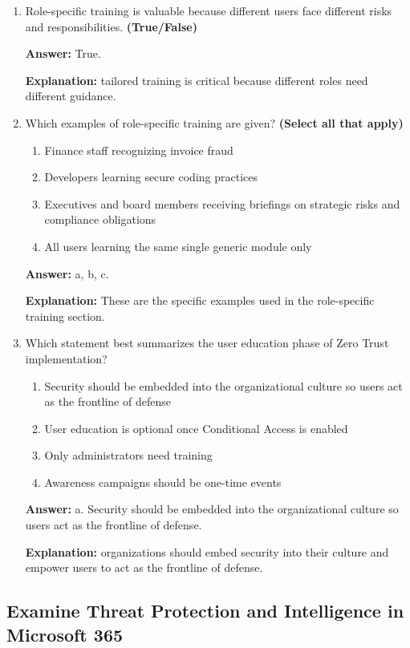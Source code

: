 \documentclass[10pt]{article}
\begin{document}
\begin{enumerate}[leftmargin=*]
\item Role-specific training is valuable because different users face different risks and responsibilities. \textbf{(True/False)}

\textbf{Answer:} True.

\textbf{Explanation:} tailored training is critical because different roles need different guidance.

\item Which examples of role-specific training are given? \textbf{(Select all that apply)}
\begin{enumerate}[label=\alph*., leftmargin=1.5em]
\item Finance staff recognizing invoice fraud
\item Developers learning secure coding practices
\item Executives and board members receiving briefings on strategic risks and compliance obligations
\item All users learning the same single generic module only
\end{enumerate}
\textbf{Answer:} a, b, c.

\textbf{Explanation:} These are the specific examples used in the role-specific training section.

\item Which statement best summarizes the user education phase of Zero Trust implementation?
\begin{enumerate}[label=\alph*., leftmargin=1.5em]
\item Security should be embedded into the organizational culture so users act as the frontline of defense
\item User education is optional once Conditional Access is enabled
\item Only administrators need training
\item Awareness campaigns should be one-time events
\end{enumerate}
\textbf{Answer:} a. Security should be embedded into the organizational culture so users act as the frontline of defense.

\textbf{Explanation:} organizations should embed security into their culture and empower users to act as the frontline of defense.

\end{enumerate}
\clearpage

\subsection{Examine Threat Protection and Intelligence in Microsoft 365}
\end{document}
